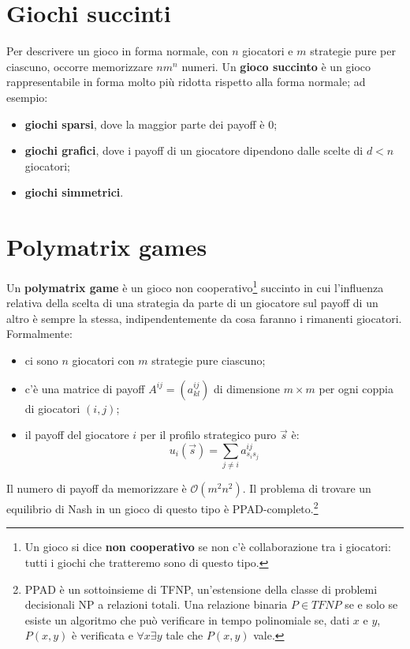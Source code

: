 \section{Giochi succinti}

Per descrivere un gioco in forma normale, con $n$ giocatori e $m$ strategie pure per ciascuno, occorre memorizzare $n m^n$ numeri. Un \textbf{gioco succinto} è un gioco rappresentabile in forma molto più ridotta rispetto alla forma normale; ad esempio:
\begin{itemize}
	\item \textbf{giochi sparsi}, dove la maggior parte dei payoff è $0$;
	\item \textbf{giochi grafici}, dove i payoff di un giocatore dipendono dalle scelte di $d < n$ giocatori;
	\item \textbf{giochi simmetrici}.
\end{itemize}

\section{Polymatrix games}

Un \textbf{polymatrix game} è un gioco non cooperativo\footnote{Un gioco si dice \textbf{non cooperativo} se non c'è collaborazione tra i giocatori: tutti i giochi che tratteremo sono di questo tipo.} succinto in cui l'influenza relativa della scelta di una strategia da parte di un giocatore sul payoff di un altro è sempre la stessa, indipendentemente da cosa faranno i rimanenti giocatori. Formalmente:
\begin{itemize}
	\item ci sono $n$ giocatori con $m$ strategie pure ciascuno;
	\item c'è una matrice di payoff $A^{ij} = (a_{kl}^{ij})$ di dimensione $m \times m$ per ogni coppia di giocatori $(i, j)$;
	\item il payoff del giocatore $i$ per il profilo strategico puro $\vec{s}$ è:
	\begin{displaymath}
		u_i(\vec{s}) = \sum_{j \neq i} a_{s_i s_j}^{ij}
	\end{displaymath}
\end{itemize}
Il numero di payoff da memorizzare è $\mathcal{O}(m^2 n^2)$. Il problema di trovare un equilibrio di Nash in un gioco di questo tipo è PPAD-completo.\footnote{PPAD è un sottoinsieme di TFNP, un'estensione della classe di problemi decisionali NP a relazioni totali. Una relazione binaria $P \in TFNP$ se e solo se esiste un algoritmo che può verificare in tempo polinomiale se, dati $x$ e $y$, $P(x, y)$ è verificata e $\forall x \exists y$ tale che $P(x, y)$ vale.}

